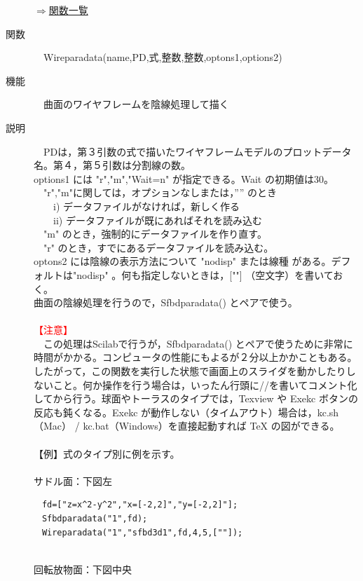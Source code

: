 \documentclass[papersize,a4paper,12pt,uplatex]{jsarticle}
\begin{document}
\begin{description}
\begin{flushright} \hyperlink{functionlist3d}{$\Rightarrow$関数一覧}\end{flushright}

\hypertarget{wireparadata}{}
\item[関数]　Wireparadata(name,PD,式,整数,整数,optons1,options2)
\item[機能]　曲面のワイヤフレームを陰線処理して描く
\item[説明]　PDは，第３引数の式で描いたワイヤフレームモデルのプロットデータ名。第４，第５引数は分割線の数。\\
options1 には "r","m","Wait=n" が指定できる。Wait の初期値は30。\\
　"r","m"に関しては，オプションなしまたは，”” のとき\\
　　i) データファイルがなければ，新しく作る\\
　　ii) データファイルが既にあればそれを読み込む\\
　"m"  のとき，強制的にデータファイルを作り直す。\\
　"r" のとき，すでにあるデータファイルを読み込む。\\ 
optons2 には陰線の表示方法について "nodisp" または線種 がある。デフォルトは"nodisp" 。何も指定しないときは，[""] （空文字）を書いておく。\\
曲面の陰線処理を行うので，Sfbdparadata() とペアで使う。\\
　\\
 \textcolor{red}{【注意】} \\
　この処理はScilabで行うが，Sfbdparadata() とペアで使うために非常に時間がかかる。コンピュータの性能にもよるが２分以上かかこともある。したがって，この関数を実行した状態で画面上のスライダを動かしたりしないこと。何か操作を行う場合は，いったん行頭に//を書いてコメント化してから行う。球面やトーラスのタイプでは，Texview や Exekc ボタンの反応も鈍くなる。Exekc が動作しない（タイムアウト）場合は，kc.sh（Mac） / kc.bat（Windows）を直接起動すれば TeX の図ができる。\\
　\\ 
【例】式のタイプ別に例を示す。\\
　\\
サドル面：下図左
\begin{verbatim}
　fd=["z=x^2-y^2","x=[-2,2]","y=[-2,2]"];
　Sfbdparadata("1",fd);
　Wireparadata("1","sfbd3d1",fd,4,5,[""]);
\end{verbatim}
　\\
回転放物面：下図中央
\begin{verbatim}

\end{verbatim}
\end{description}
\end{document}
